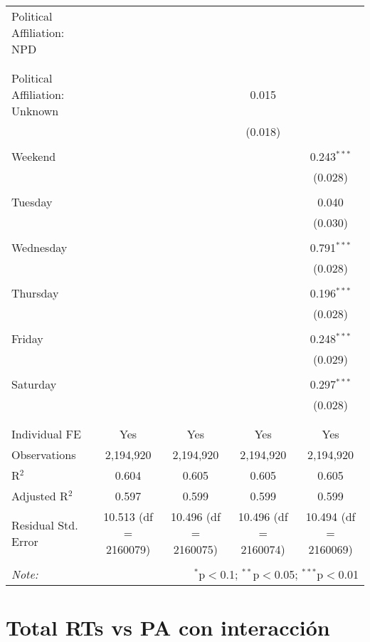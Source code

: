 \documentclass[
]{article}
\begin{document}
\begin{table}[!htbp]
{\begin{tabular}{@{\extracolsep{5pt}}lcccc}
 Political Affiliation: NPD &  &  &  &  \\ 
  &  &  &  &  \\ 
  & & & & \\ 
 Political Affiliation: Unknown &  &  & 0.015 &  \\ 
  &  &  & (0.018) &  \\ 
  & & & & \\ 
 Weekend &  &  &  & 0.243$^{***}$ \\ 
  &  &  &  & (0.028) \\ 
  & & & & \\ 
 Tuesday &  &  &  & 0.040 \\ 
  &  &  &  & (0.030) \\ 
  & & & & \\ 
 Wednesday &  &  &  & 0.791$^{***}$ \\ 
  &  &  &  & (0.028) \\ 
  & & & & \\ 
 Thursday &  &  &  & 0.196$^{***}$ \\ 
  &  &  &  & (0.028) \\ 
  & & & & \\ 
 Friday &  &  &  & 0.248$^{***}$ \\ 
  &  &  &  & (0.029) \\ 
  & & & & \\ 
 Saturday &  &  &  & 0.297$^{***}$ \\ 
  &  &  &  & (0.028) \\ 
  & & & & \\ 
\hline \\[-1.8ex] 
Individual FE & Yes & Yes & Yes & Yes \\ 
Observations & 2,194,920 & 2,194,920 & 2,194,920 & 2,194,920 \\ 
R$^{2}$ & 0.604 & 0.605 & 0.605 & 0.605 \\ 
Adjusted R$^{2}$ & 0.597 & 0.599 & 0.599 & 0.599 \\ 
Residual Std. Error & 10.513 (df = 2160079) & 10.496 (df = 2160075) & 10.496 (df = 2160074) & 10.494 (df = 2160069) \\ 
\hline 
\hline \\[-1.8ex] 
\textit{Note:}  & \multicolumn{4}{r}{$^{*}$p$<$0.1; $^{**}$p$<$0.05; $^{***}$p$<$0.01} \\ 
\end{tabular}
} 
\end{table} 
\newpage
\section{Total RTs vs PA con interacción}
\end{document}
